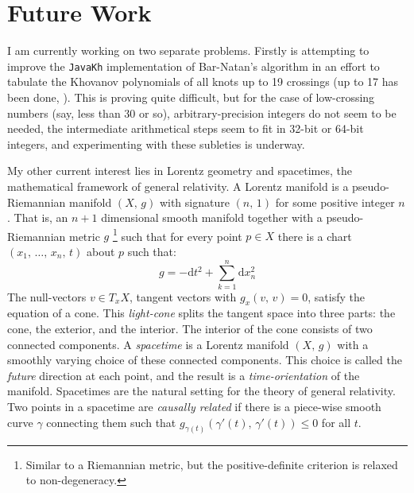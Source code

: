 \documentclass{article}
\theoremstyle{plain}
\begin{document}
    \section{Future Work}
        I am currently working on two separate problems. Firstly is attempting
        to improve the \texttt{JavaKh} implementation of Bar-Natan's
        algorithm \cite{BarNatan2006FASTKH} in an effort to tabulate the
        Khovanov polynomials of all knots up to 19 crossings (up to 17 has
        been done, \cite{KhovanovData}). This is proving quite difficult, but
        for the case of low-crossing numbers (say, less than 30 or so),
        arbitrary-precision integers do not seem to be needed, the intermediate
        arithmetical steps seem to fit in 32-bit or 64-bit integers, and
        experimenting with these subleties is underway.
        \par\hfill\par
        My other current interest lies in Lorentz geometry and spacetimes,
        the mathematical framework of general relativity. A Lorentz manifold
        is a pseudo-Riemannian manifold $(X,\,g)$ with signature $(n,\,1)$ for
        some positive integer $n$. That is, an $n+1$ dimensional smooth
        manifold together with a pseudo-Riemannian metric $g$%
        \footnote{
            Similar to a Riemannian metric, but the positive-definite
            criterion is relaxed to non-degeneracy.
        }
        such that for every point $p\in{X}$ there is a chart
        $(x_{1},\,\dots,\,x_{n},\,t)$ about $p$ such that:
        \begin{equation}
            g=-\textrm{d}t^{2}+\sum_{k=1}^{n}\textrm{d}x_{n}^{2}
        \end{equation}
        The null-vectors $v\in{T}_{x}X$, tangent vectors with
        $g_{x}(v,\,v)=0$, satisfy the equation of a cone. This
        \textit{light-cone} splits the tangent space into three parts: the
        cone, the exterior, and the interior. The interior of the cone consists
        of two connected components. A \textit{spacetime} is a Lorentz manifold
        $(X,\,g)$ with a smoothly varying choice of these connected
        components. This choice is called the \textit{future} direction at
        each point, and the result is a \textit{time-orientation} of the
        manifold. Spacetimes are the natural setting for the theory of
        general relativity. Two points in a spacetime are
        \textit{causally related} if there is a piece-wise smooth curve
        $\gamma$ connecting them such that
        $g_{\gamma(t)}(\gamma'(t),\,\gamma'(t))\leq{0}$ for all $t$.
\end{document}
